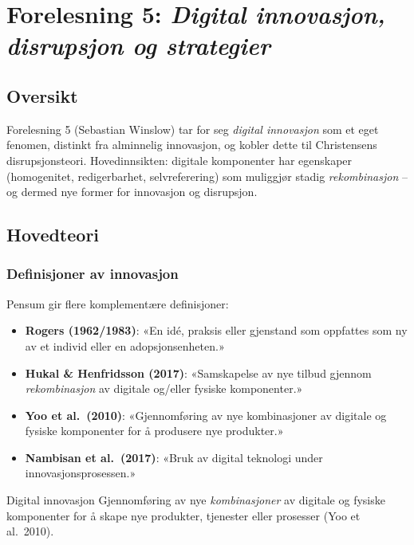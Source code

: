 \section{Forelesning 5: \emph{Digital innovasjon, disrupsjon og strategier}}
\label{sec:lec05}

\subsection*{Oversikt}
Forelesning 5 (Sebastian Winslow) tar for seg \emph{digital innovasjon} som et
eget fenomen, distinkt fra alminnelig innovasjon, og kobler dette til
Christensens disrupsjonsteori. Hovedinnsikten: digitale komponenter har
egenskaper (homogenitet, redigerbarhet, selvreferering) som muliggjør stadig
\emph{rekombinasjon} -- og dermed nye former for innovasjon og disrupsjon.

\subsection{Hovedteori}

\subsubsection*{Definisjoner av innovasjon}
Pensum gir flere komplementære definisjoner:
\begin{itemize}
  \item \textbf{Rogers (1962/1983)}: «En idé, praksis eller gjenstand som
    oppfattes som ny av et individ eller en adopsjonsenheten.»
  \item \textbf{Hukal \& Henfridsson (2017)}: «Samskapelse av nye tilbud
    gjennom \emph{rekombinasjon} av digitale og/eller fysiske komponenter.»
  \item \textbf{Yoo et al.\ (2010)}: «Gjennomføring av nye kombinasjoner av
    digitale og fysiske komponenter for å produsere nye produkter.»
  \item \textbf{Nambisan et al.\ (2017)}: «Bruk av digital teknologi under
    innovasjonsprosessen.»
\end{itemize}

\begin{definition}{Digital innovasjon}
Gjennomføring av nye \emph{kombinasjoner} av digitale og fysiske komponenter
for å skape nye produkter, tjenester eller prosesser (Yoo et al.\ 2010).
\end{definition}

